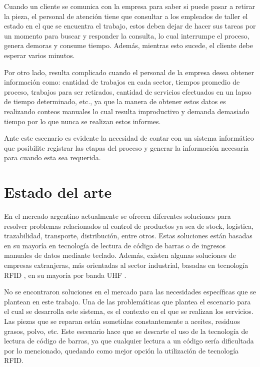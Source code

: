 Cuando un cliente se comunica con la empresa para saber si puede pasar a retirar la pieza, el personal de atención tiene que consultar a los empleados de taller el estado en el que se encuentra el trabajo, estos deben dejar de hacer sus tareas por un momento para buscar y responder la consulta, lo cual interrumpe el proceso, genera demoras y consume tiempo. Además, mientras esto sucede, el cliente debe esperar varios minutos. 

Por otro lado, resulta complicado cuando el personal de la empresa desea obtener información como: cantidad de trabajos en cada sector, tiempos promedio de proceso, trabajos para ser retirados, cantidad de servicios efectuados en un lapso de tiempo determinado, etc., ya que la manera de obtener estos datos es realizando conteos manuales lo cual resulta improductivo y demanda demasiado tiempo por lo que nunca se realizan estos informes.

Ante este escenario es evidente la necesidad de contar con un sistema informático que posibilite registrar las etapas del proceso y generar la información necesaria para cuando esta sea requerida.


\section{Estado del arte}

En el mercado argentino actualmente se ofrecen diferentes soluciones para resolver problemas relacionados al control de productos ya sea de stock, logística, trazabilidad, transporte, distribución, entre otros. Estas soluciones están basadas en su mayoría en tecnología de lectura de código de barras o de ingresos manuales de datos mediante teclado. Además, existen algunas soluciones de empresas extranjeras, más orientadas al sector industrial, basadas en tecnología RFID \citep{WEBSITE:RFID}, en su mayoría por banda UHF \citep{WEBSITE:UHF}.

No se encontraron soluciones en el mercado para las necesidades específicas que se plantean en este trabajo. Una de las problemáticas que plantea el escenario para el cual se desarrolla este sistema, es el contexto en el que se realizan los servicios. Las piezas que se reparan están sometidas constantemente a aceites, residuos grasos, polvo, etc. Este escenario hace que se descarte el uso de la tecnología de lectura de código de barras, ya que cualquier lectura a un código sería dificultada por lo mencionado, quedando como mejor opción la utilización de tecnología RFID.

